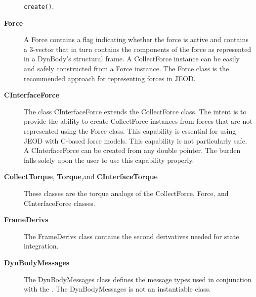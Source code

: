 \begin{description}
  {\tt create()}.
\item[\bf Force] A Force contains a flag indicating whether the force is active
  and contains a 3-vector that in turn contains the components of the force as
  represented in a DynBody's structural frame. A CollectForce instance can be
  easily and safely constructed from a Force instance. The Force class is the
  recommended approach for representing forces in JEOD.
\item[\bf CInterfaceForce] The class CInterfaceForce extends the CollectForce
  class. The intent is to provide the ability to create CollectForce instances
  from forces that are not represented using the Force class. This capability is
  essential for using JEOD with C-based force models. This capability is not
  particularly safe. A CInterfaceForce can be created from any double pointer.
  The burden falls solely upon the user to use this capability properly.
\item[{\bf CollectTorque}, {\bf Torque},and {\bf CInterfaceTorque}] These
  classes are the torque analogs of the CollectForce, Force, and CInterfaceForce
  classes.
\item[\bf FrameDerivs] The FrameDerivs class contains the second derivatives
  needed for state integration.
\item[\bf DynBodyMessages] The DynBodyMessages class defines the message
  types used in conjunction with the . The
  DynBodyMessages is not an instantiable class.
\end{description}
